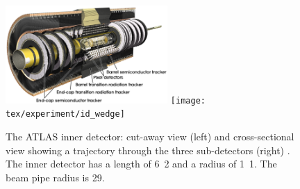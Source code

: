 \begin{figure}[t]
	\includegraphics[width=0.55\textwidth]{tex/experiment/id_whole}
	\hfill
	\texttt{[image: tex/experiment/id\_wedge]}
	\caption{The ATLAS inner detector: cut-away view (left) and cross-sectional view 
	showing a trajectory through the three sub-detectors (right) \cite{ATLAS-detector}. 
	The inner detector has a length of \unit{6.2}{\metre} and a radius of 
	\unit{1.1}{\metre}. The beam pipe radius is \unit{29}{\milli\metre}.}
	\label{fig:inner_detector}
\end{figure}


